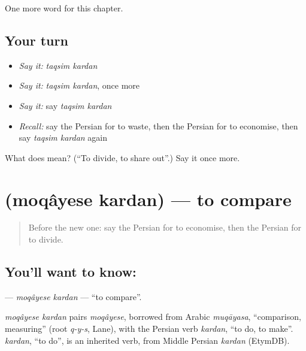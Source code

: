 \begin{grammarlens}[title={What you've built}]
One more word for this chapter.
\end{grammarlens}

\subsection*{Your turn}
\begin{itemize}
\raggedright
  \item \emph{Say it:} \emph{taqsim kardan}
  \item \emph{Say it:} \emph{taqsim kardan}, once more
  \item \emph{Say it:} say \emph{taqsim kardan}
  \item \emph{Recall:} say the Persian for to waste, then the Persian for to economise, then say \emph{taqsim kardan} again
\end{itemize}

\begin{tcolorbox}[breakable,colback=teal!4,colframe=teal!35!black,title={Before you move on}]
What does   mean? (\textquotedblleft{}To divide, to share out\textquotedblright{}.) Say it once more.
\end{tcolorbox}
\section[\texorpdfstring{\fa{مقایسه} \fa{کردن} (moqâyese kardan)}{مقایسه کردن (moqâyese kardan)}]{  (moqâyese kardan) — to compare}

\label{lesson:FA-C149-moqayese-kardan}



\begin{quote}
Before the new one: say the Persian for to economise, then the Persian for to divide.
\end{quote}

\subsection*{You'll want to know:  }
\textbf{ } — \emph{moqâyese kardan} — \textquotedblleft{}to compare\textquotedblright{}.

\begin{cousinweb}
\emph{moqâyese kardan} pairs \emph{moqâyese}, borrowed from Arabic \emph{muqāyasa}, \textquotedblleft{}comparison, measuring\textquotedblright{} (root \emph{q-y-s}, Lane), with the Persian verb \emph{kardan}, \textquotedblleft{}to do, to make\textquotedblright{}. \emph{kardan}, \textquotedblleft{}to do\textquotedblright{}, is an inherited verb, from Middle Persian \emph{kardan} (EtymDB).
\end{cousinweb}

